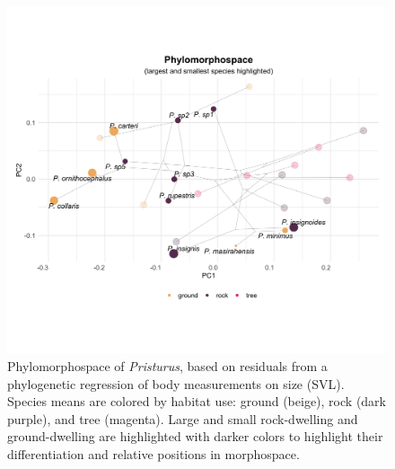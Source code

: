 \documentclass[
  11pt,
]{article}
\begin{document}
\newpage

\begin{figure}
\includegraphics[width=1\linewidth]{Figs/phylomorphospace_large_small} \caption{Phylomorphospace of \textit{Pristurus}, based on residuals from a phylogenetic regression of body measurements on size (SVL). Species means are colored by habitat use: ground (beige), rock (dark purple), and tree (magenta). Large and small rock-dwelling and ground-dwelling are highlighted with darker colors to highlight their differentiation and relative positions in morphospace.}\label{fig:unnamed-chunk-6}
\end{figure}
\end{document}
